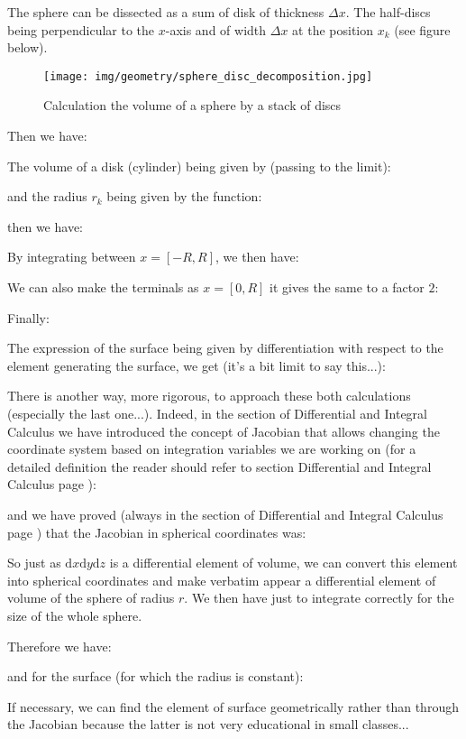 {	The sphere can be dissected as a sum of disk of thickness $\Delta x$. The half-discs being perpendicular to the $x$-axis and of width $\Delta x$ at the position $x_k$  (see figure below).
	\begin{figure}[H]
		\centering
		\texttt{[image: img/geometry/sphere\_disc\_decomposition.jpg]}
		\caption{Calculation the volume of a sphere by a stack of discs}
	\end{figure}
	Then we have:
	
	The volume of a disk (cylinder) being given by (passing to the limit):
	
	and the radius $r_k$ being given by the function:
	
	then we have:
	
	By integrating between $x=[-R,R]$, we then have:
	
	We can also make the terminals as $x=[0,R]$ it gives the same to a factor $2$:
	
	Finally:
	
	The expression of the surface being given by differentiation with respect to the element generating the surface, we get (it's a bit limit to say this...)\label{surface of a sphere}:
	
	There is another way, more rigorous, to approach these both calculations (especially the last one...). Indeed, in the section of Differential and Integral Calculus we have introduced the concept of Jacobian that allows changing the coordinate system based on integration variables we are working on (for a detailed definition the reader should refer to section Differential and Integral Calculus page \pageref{jacobian}):
	
	and we have proved (always in the section of Differential and Integral Calculus page \pageref{jacobian spherical coordinates}) that the Jacobian in spherical coordinates was:
	
	So just as $\mathrm{d}x\mathrm{d}y\mathrm{d}z$ is a differential element of volume, we can convert this element into spherical coordinates and make verbatim appear a differential element of volume of the sphere of radius $r$. We then have just to integrate correctly for the size of the whole sphere.

	Therefore we have:
	
	and for the surface (for which the radius is constant):
	
	If necessary, we can find the element of surface geometrically rather than through the Jacobian because the latter is not very educational in small classes...
	
}
